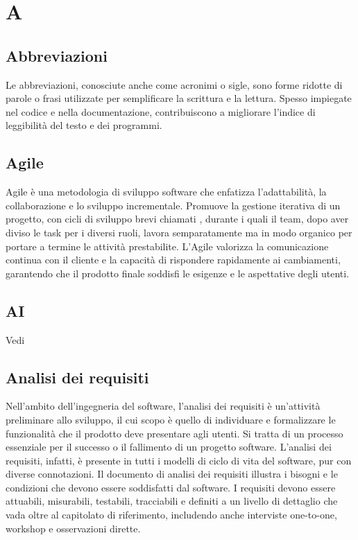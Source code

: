 \section{A}

\vspace{2em}
\subsection*{Abbreviazioni}
Le abbreviazioni, conosciute anche come acronimi o sigle, sono forme ridotte di parole o frasi utilizzate per semplificare la scrittura e la lettura. Spesso impiegate nel codice e nella documentazione, contribuiscono a migliorare l'indice di leggibilità del testo e dei programmi.

\vspace{2em}
\subsection*{Agile}
Agile è una metodologia di sviluppo software che enfatizza l'adattabilità, la collaborazione e lo sviluppo incrementale. Promuove la gestione iterativa di un progetto, con cicli di sviluppo brevi chiamati , durante i quali il team, dopo aver diviso le task per i diversi ruoli, lavora semparatamente ma in modo organico per portare a termine le attività prestabilite. L'Agile valorizza la comunicazione continua con il cliente e la capacità di rispondere rapidamente ai cambiamenti, garantendo che il prodotto finale soddisfi le esigenze e le aspettative degli utenti.

\vspace{2em}
\subsection*{AI}
\par Vedi 

\vspace{2em}
\subsection*{Analisi dei requisiti}
Nell’ambito dell’ingegneria del software, l’analisi dei requisiti è un’attività preliminare allo sviluppo, il cui scopo è quello di individuare e formalizzare le funzionalità che il prodotto deve presentare agli utenti. Si tratta di un processo essenziale per il successo o il fallimento di un progetto software. L'analisi dei requisiti, infatti, è presente in tutti i modelli di ciclo di vita del software, pur con diverse connotazioni. Il documento di analisi dei requisiti illustra i bisogni e le condizioni che devono essere soddisfatti dal software. I requisiti devono essere attuabili, misurabili, testabili, tracciabili e definiti a un livello di dettaglio che vada oltre al capitolato di riferimento, includendo anche interviste one-to-one, workshop e osservazioni dirette.

